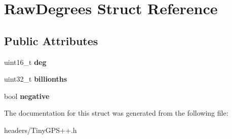 \section{Raw\+Degrees Struct Reference}
\label{struct_raw_degrees}
\subsection*{Public Attributes}
\begin{DoxyCompactItemize}
\item 
uint16\+\_\+t {\bfseries deg}\label{struct_raw_degrees_a11831d9220f303bd716d9412af28e84e}

\item 
uint32\+\_\+t {\bfseries billionths}\label{struct_raw_degrees_a13564009c60e20dbf03b158114d1c0e2}

\item 
bool {\bfseries negative}\label{struct_raw_degrees_a39c31d2d0332155a4d2c975cec0a796f}

\end{DoxyCompactItemize}


The documentation for this struct was generated from the following file\+:\begin{DoxyCompactItemize}
\item 
headers/Tiny\+G\+P\+S++.\+h\end{DoxyCompactItemize}
